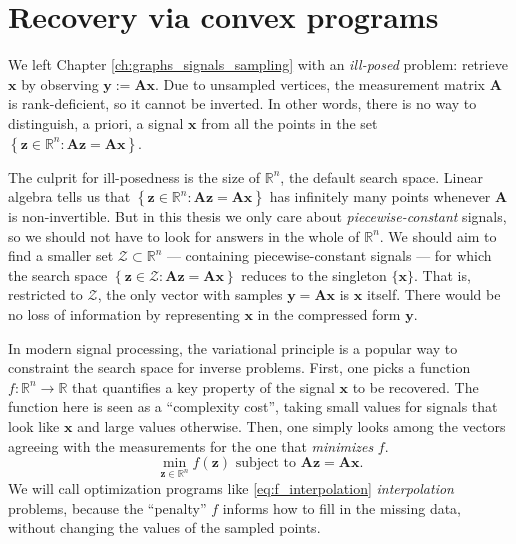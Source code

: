 \chapter{Recovery via convex programs}\label{ch:recovery_convex}

We left Chapter \ref{ch:graphs_signals_sampling} with an \emph{ill-posed} problem: retrieve $\mathbf{x}$ by observing $\mathbf{y} := \mathbf{Ax}$. Due to unsampled vertices, the measurement matrix $\mathbf{A}$ is rank-deficient, so it cannot be inverted. In other words, there is no way to distinguish, a priori, a signal $\mathbf{x}$ from all the points in the set $\left \{ \mathbf{z} \in \mathbb{R}^{n} : \mathbf{Az} = \mathbf{Ax} \right \}$.

The culprit for ill-posedness is the size of $\mathbb{R}^{n}$, the default search space. Linear algebra tells us that $\left \{ \mathbf{z} \in \mathbb{R}^{n} : \mathbf{Az} = \mathbf{Ax} \right \}$ has infinitely many points whenever $\mathbf{A}$ is non-invertible. But in this thesis we only care about \emph{piecewise-constant} signals, so we should not have to look for answers in the whole of $\mathbb{R}^{n}$. We should aim to find a smaller set $\mathcal{Z} \subset \mathbb{R}^{n}$ --- containing piecewise-constant signals --- for which the search space $\left \{ \mathbf{z} \in \mathcal{Z} : \mathbf{Az} = \mathbf{Ax} \right \}$ reduces to the singleton $\{ \mathbf{x} \}$. That is, restricted to $\mathcal{Z}$, the only vector with samples $\mathbf{y} = \mathbf{Ax}$ is $\mathbf{x}$ itself. There would be no loss of information by representing $\mathbf{x}$ in the compressed form $\mathbf{y}$.

In modern signal processing, the variational principle is a popular way to constraint the search space for inverse problems. First, one picks a function $f : \mathbb{R}^{n} \to \mathbb{R}$ that quantifies a key property of the signal $\mathbf{x}$ to be recovered. The function here is seen as a ``complexity cost'', taking small values for signals that look like $\mathbf{x}$ and large values otherwise. Then, one simply looks among the vectors agreeing with the measurements for the one that \emph{minimizes} $f$.
\begin{equation}
    \underset{\mathbf{z} \in \mathbb{R}^{n}}{\min} f(\mathbf{z}) \text{ subject to } \mathbf{Az = Ax}. \tag{P$f$} \label{eq:f_interpolation}
\end{equation}
We will call optimization programs like \eqref{eq:f_interpolation} \emph{interpolation} problems, because the ``penalty'' $f$ informs how to fill in the missing data, without changing the values of the sampled points.

